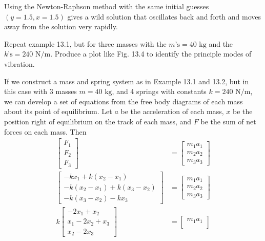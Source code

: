 \documentclass{article}
\begin{document}
\begin{solution}
Using the Newton-Raphson method with the same initial guesses $(y=1.5,x=1.5)$ gives a wild solution that oscillates back and forth and moves away from the solution very rapidly.
\end{solution}

\setcounter{problem}{0}
\begin{problem}
Repeat example 13.1, but for three masses with the $m\text{'s}=40\text{ kg}$ and the $k\text{'s}=240\text{ N/m}$. Produce a plot like Fig. 13.4 to identify the principle modes of vibration.
\end{problem}

\begin{solution}
If we construct a mass and spring system as in Example 13.1 and 13.2, but in this case with 3 masses $m=40\text{ kg}$, and 4 springs with constants $k = 240\text{ N/m}$, we can develop a set of equations from the free body diagrams of each mass about its point of equilibrium. Let $a$ be the acceleration of each mass, $x$ be the position right of equilibrium on the track of each mass, and $F$ be the sum of net forces on each mass. Then
\begin{align*}
\begin{bmatrix}
F_{1}\\
F_{2}\\
F_{3}
\end{bmatrix}
&=
\begin{bmatrix}
m_{1}a_{1}\\
m_{2}a_{2}\\
m_{3}a_{3}
\end{bmatrix}
\\
\begin{bmatrix}
-kx_{1} +k(x_{2}-x_{1})\\
-k(x_{2}-x_{1})+k(x_{3}-x_{2})\\
-k(x_{3}-x_{2})-kx_{3}
\end{bmatrix}
&=
\begin{bmatrix}
m_{1}a_{1}\\
m_{2}a_{2}\\
m_{3}a_{3}
\end{bmatrix}
\\
k
\begin{bmatrix}
-2x_{1}+x_{2}\\
x_{1}-2x_{2}+x_{3}\\
x_{2}-2x_{3}
\end{bmatrix}
&=
\begin{bmatrix}
m_{1}a_{1}\\

\end{bmatrix}
\end{align*}
\end{solution}
\end{document}
